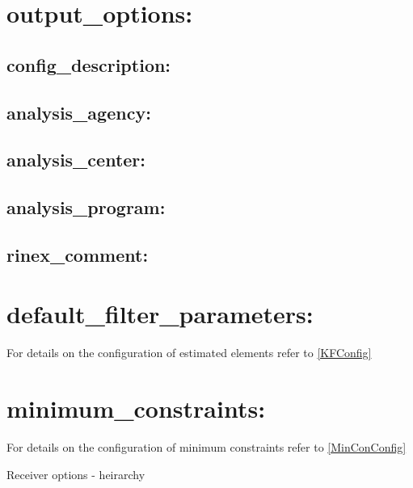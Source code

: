\section*{output\_options:}

\subsection*{config\_description:}

\subsection*{analysis\_agency:}

\subsection*{analysis\_center:}

\subsection*{analysis\_program:}

\subsection*{rinex\_comment:}


\section{default\_filter\_parameters:}

For details on the configuration of estimated elements refer to \ref{KFConfig}

\section{minimum\_constraints:}

For details on the configuration of minimum constraints refer to \ref{MinConConfig}

Receiver options - heirarchy




